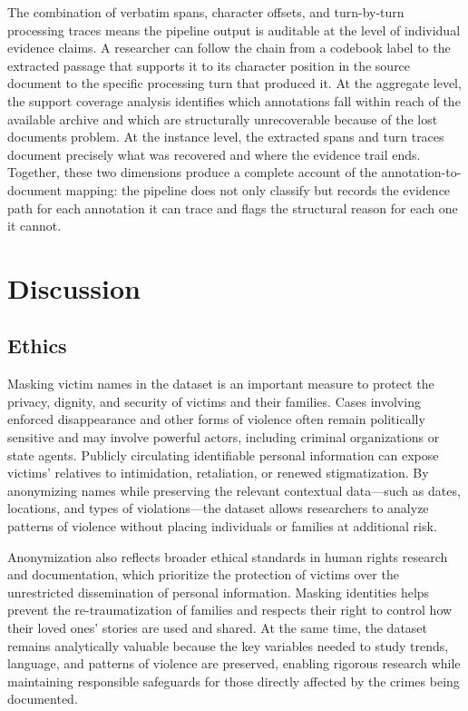 \documentclass{article}
\begin{document}
The combination of verbatim spans, character offsets, and turn-by-turn processing traces means the pipeline output is auditable at the level of individual evidence claims. A researcher can follow the chain from a codebook label to the extracted passage that supports it to its character position in the source document to the specific processing turn that produced it. At the aggregate level, the support coverage analysis identifies which annotations fall within reach of the available archive and which are structurally unrecoverable because of the lost documents problem. At the instance level, the extracted spans and turn traces document precisely what was recovered and where the evidence trail ends. Together, these two dimensions produce a complete account of the annotation-to-document mapping: the pipeline does not only classify but records the evidence path for each annotation it can trace and flags the structural reason for each one it cannot.


\section{Discussion}\label{discussion}

\subsection{Ethics}\label{ethics}

Masking victim names in the dataset is an important measure to protect the privacy, dignity, and security of victims and their families. Cases involving enforced disappearance and other forms of violence often remain politically sensitive and may involve powerful actors, including criminal organizations or state agents. Publicly circulating identifiable personal information can expose victims’ relatives to intimidation, retaliation, or renewed stigmatization. By anonymizing names while preserving the relevant contextual data—such as dates, locations, and types of violations—the dataset allows researchers to analyze patterns of violence without placing individuals or families at additional risk.

Anonymization also reflects broader ethical standards in human rights research and documentation, which prioritize the protection of victims over the unrestricted dissemination of personal information. Masking identities helps prevent the re-traumatization of families and respects their right to control how their loved ones’ stories are used and shared. At the same time, the dataset remains analytically valuable because the key variables needed to study trends, language, and patterns of violence are preserved, enabling rigorous research while maintaining responsible safeguards for those directly affected by the crimes being documented.
\end{document}
